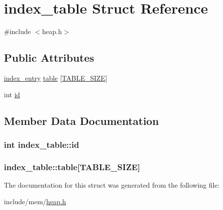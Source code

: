 \hypertarget{structindex__table}{}\section{index\+\_\+table Struct Reference}
\label{structindex__table}


{\ttfamily \#include $<$heap.\+h$>$}

\subsection*{Public Attributes}
\begin{DoxyCompactItemize}
\item 
\hyperlink{structindex__entry}{index\+\_\+entry} \hyperlink{structindex__table_ae69e0312bad59289ac303989d06c565d}{table} \mbox{[}\hyperlink{heap_8h_a032503e76d6f69bc67e99e909c8125da}{T\+A\+B\+L\+E\+\_\+\+S\+I\+Z\+E}\mbox{]}
\item 
int \hyperlink{structindex__table_a6e0e8e27a6a47e8ae2078b6fa447087f}{id}
\end{DoxyCompactItemize}


\subsection{Member Data Documentation}
\hypertarget{structindex__table_a6e0e8e27a6a47e8ae2078b6fa447087f}{}
\subsubsection[{id}]{\setlength{\rightskip}{0pt plus 5cm}int index\+\_\+table\+::id}\label{structindex__table_a6e0e8e27a6a47e8ae2078b6fa447087f}
\hypertarget{structindex__table_ae69e0312bad59289ac303989d06c565d}{}
\subsubsection[{table}]{ index\+\_\+table\+::table\mbox{[}{\bf T\+A\+B\+L\+E\+\_\+\+S\+I\+Z\+E}\mbox{]}}\label{structindex__table_ae69e0312bad59289ac303989d06c565d}


The documentation for this struct was generated from the following file\+:\begin{DoxyCompactItemize}
\item 
include/mem/\hyperlink{heap_8h}{heap.\+h}\end{DoxyCompactItemize}
